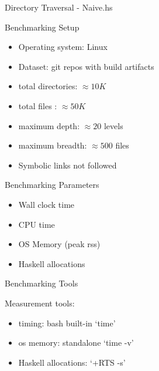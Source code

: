 \documentclass[17pt]{beamer}
\begin{document}
\begin{frame}[fragile]{Directory Traversal - Naive.hs}
{}
\tiny
\begin{minipage}{\textwidth}
\end{minipage}
\end{frame}

\begin{frame}{Benchmarking Setup}{}
\begin{itemize}
  \item Operating system: Linux
  \item Dataset: git repos with build artifacts
  \item total directories: $\approx 10K$
  \item total files : $\approx 50K$
  \item maximum depth: $$ levels
  \item maximum breadth: $$ files
  \item Symbolic links not followed
\end{itemize}
\end{frame}

\begin{frame}{Benchmarking Parameters}{}

\begin{itemize}
  \item Wall clock time
  \item CPU time
  \item OS Memory (peak rss)
  \item Haskell allocations
\end{itemize}
\end{frame}

\begin{frame}{Benchmarking Tools}{}

Measurement tools:
\begin{itemize}
  \item timing: bash built-in `time'
  \item os memory: standalone `time -v'
  \item Haskell allocations: `+RTS -s'
\end{itemize}
\end{frame}
\end{document}
